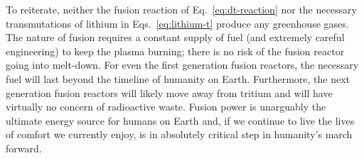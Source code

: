 To reiterate, neither the fusion reaction of Eq.~\ref{eq:dt-reaction} nor the necessary transmutations of lithium in Eqs.~\ref{eq:lithium-t} produce any greenhouse gases. The nature of fusion requires a constant supply of fuel (and extremely careful engineering) to keep the plasma burning; there is no risk of the fusion reactor going into melt-down. For even the first generation fusion reactors, the necessary fuel will last beyond the timeline of humanity on Earth. Furthermore, the next generation fusion reactors will likely move away from tritium and will have virtually no concern of radioactive waste. Fusion power is unarguably the ultimate energy source for humans on Earth and, if we continue to live the lives of comfort we currently enjoy, is in absolutely critical step in humanity's march forward.


